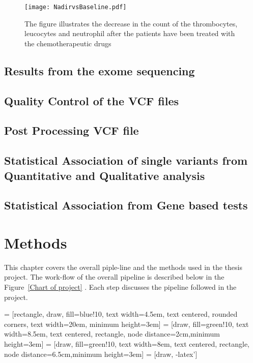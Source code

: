 \begin{figure}[h]
	\begin{center}
		\texttt{[image: NadirvsBaseline.pdf]}
		\caption{The figure illustrates the decrease in the count of the thrombocytes, leucocytes and neutrophil after the patients have been treated with the chemotherapeutic drugs}
		\label{NadirVSBaseline}
	\end{center}
\end{figure}

\section{Results from the exome sequencing}
\section{Quality Control of the VCF files}
\section{Post Processing VCF file}
\section {Statistical Association of single variants from Quantitative and Qualitative analysis}
\section{Statistical Association from Gene based tests}




\chapter{Methods}

This chapter covers the overall piple-line  and the methods used in the thesis project. The work-flow of the overall pipeline is described below in the Figure~\ref{Chart of project} . Each step discusses the pipeline followed in the project.  
  
  
 = [rectangle, draw, fill=blue!10, text width=4.5em, text centered, rounded corners, text width=20em, minimum height=3em]
 = [draw, fill=green!10, text width=8.5em, text centered, rectangle, node distance=2cm,minimum height=3em]
 = [draw, fill=green!10, text width=8em, text centered, rectangle, node distance=6.5cm,minimum height=3em]
 = [draw, -latex']
  
